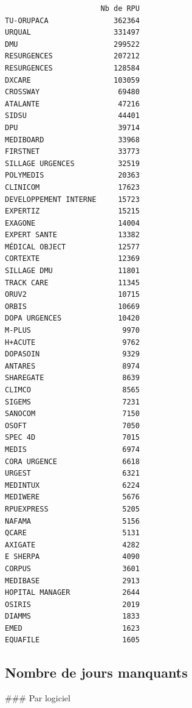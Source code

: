 \documentclass[]{article}
\begin{document}
\begin{verbatim}
                      Nb de RPU
TU-ORUPACA               362364
URQUAL                   331497
DMU                      299522
RESURGENCES              207212
RESURGENCES              128584
DXCARE                   103059
CROSSWAY                  69480
ATALANTE                  47216
SIDSU                     44401
DPU                       39714
MEDIBOARD                 33968
FIRSTNET                  33773
SILLAGE URGENCES          32519
POLYMEDIS                 20363
CLINICOM                  17623
DEVELOPPEMENT INTERNE     15723
EXPERTIZ                  15215
EXAGONE                   14004
EXPERT SANTE              13382
MÉDICAL OBJECT            12577
CORTEXTE                  12369
SILLAGE DMU               11801
TRACK CARE                11345
ORUV2                     10715
ORBIS                     10669
DOPA URGENCES             10420
M-PLUS                     9970
H+ACUTE                    9762
DOPASOIN                   9329
ANTARES                    8974
SHAREGATE                  8639
CLIMCO                     8565
SIGEMS                     7231
SANOCOM                    7150
OSOFT                      7050
SPEC 4D                    7015
MEDIS                      6974
CORA URGENCE               6618
URGEST                     6321
MEDINTUX                   6224
MEDIWERE                   5676
RPUEXPRESS                 5205
NAFAMA                     5156
QCARE                      5131
AXIGATE                    4282
E SHERPA                   4090
CORPUS                     3601
MEDIBASE                   2913
HOPITAL MANAGER            2644
OSIRIS                     2019
DIAMMS                     1833
EMED                       1623
EQUAFILE                   1605
\end{verbatim}

\subsection{Nombre de jours manquants}\label{nombre-de-jours-manquants}

\#\#\# Par logiciel
\end{document}
